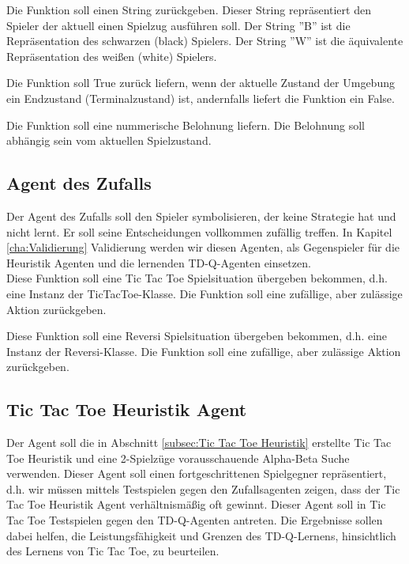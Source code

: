 Die Funktion soll einen String zurückgeben. Dieser String repräsentiert den Spieler der aktuell einen Spielzug ausführen soll. Der String ''B'' ist die Repräsentation des schwarzen (black) Spielers. Der String ''W'' ist die äquivalente Repräsentation des weißen (white) Spielers.

Die Funktion soll True zurück liefern, wenn der aktuelle Zustand der Umgebung ein Endzustand (Terminalzustand) ist, andernfalls liefert die Funktion ein False.

Die Funktion soll eine nummerische Belohnung liefern. Die Belohnung soll abhängig sein vom aktuellen Spielzustand.

\subsection{Agent des Zufalls}
Der Agent des Zufalls soll den Spieler symbolisieren, der keine Strategie hat und nicht lernt. Er soll seine Entscheidungen vollkommen zufällig treffen. In Kapitel \ref{cha:Validierung} Validierung werden wir diesen Agenten, als Gegenspieler für die Heuristik Agenten und die lernenden TD-Q-Agenten einsetzen. \\

Diese Funktion soll eine Tic Tac Toe Spielsituation übergeben bekommen, d.h. eine Instanz der TicTacToe-Klasse. Die Funktion soll eine zufällige, aber zulässige Aktion zurückgeben.

Diese Funktion soll eine Reversi Spielsituation übergeben bekommen, d.h. eine Instanz der Reversi-Klasse. Die Funktion soll eine zufällige, aber zulässige Aktion zurückgeben.

\subsection{Tic Tac Toe Heuristik Agent}
Der Agent soll die in Abschnitt \ref{subsec:Tic Tac Toe Heuristik} erstellte Tic Tac Toe Heuristik und eine 2-Spielzüge vorausschauende Alpha-Beta Suche verwenden. Dieser Agent soll einen fortgeschrittenen Spielgegner repräsentiert, d.h. wir müssen mittels Testspielen gegen den Zufallsagenten zeigen, dass der Tic Tac Toe Heuristik Agent verhältnismäßig oft gewinnt. Dieser Agent soll in Tic Tac Toe Testspielen gegen den TD-Q-Agenten antreten. Die Ergebnisse sollen dabei helfen, die Leistungsfähigkeit und Grenzen des TD-Q-Lernens, hinsichtlich des Lernens von Tic Tac Toe, zu beurteilen. 

